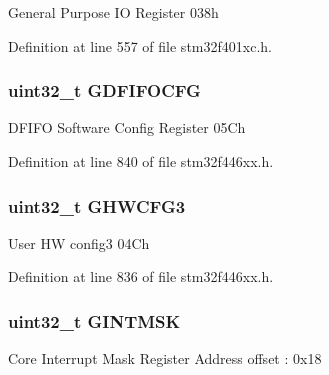 General Purpose IO Register 038h 

Definition at line 557 of file stm32f401xc.\+h.

\subsubsection[{\texorpdfstring{G\+D\+F\+I\+F\+O\+C\+FG}{GDFIFOCFG}}]{ uint32\+\_\+t G\+D\+F\+I\+F\+O\+C\+FG}\hypertarget{struct_u_s_b___o_t_g___global_type_def_ae1f4aabfcdebfaf2cdaf05a96dc0fcb7}{}\label{struct_u_s_b___o_t_g___global_type_def_ae1f4aabfcdebfaf2cdaf05a96dc0fcb7}
D\+F\+I\+FO Software Config Register 05\+Ch 

Definition at line 840 of file stm32f446xx.\+h.

\subsubsection[{\texorpdfstring{G\+H\+W\+C\+F\+G3}{GHWCFG3}}]{ uint32\+\_\+t G\+H\+W\+C\+F\+G3}\hypertarget{struct_u_s_b___o_t_g___global_type_def_acaf5563a43c7dd8ba9b982df9581acaa}{}\label{struct_u_s_b___o_t_g___global_type_def_acaf5563a43c7dd8ba9b982df9581acaa}
User HW config3 04\+Ch 

Definition at line 836 of file stm32f446xx.\+h.

\subsubsection[{\texorpdfstring{G\+I\+N\+T\+M\+SK}{GINTMSK}}]{ uint32\+\_\+t G\+I\+N\+T\+M\+SK}\hypertarget{struct_u_s_b___o_t_g___global_type_def_a69d9432b4272331bffb34e196b57cbdf}{}\label{struct_u_s_b___o_t_g___global_type_def_a69d9432b4272331bffb34e196b57cbdf}
Core Interrupt Mask Register Address offset \+: 0x18

